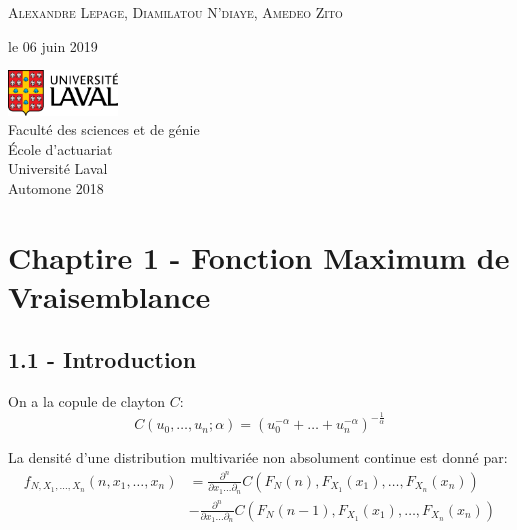 \documentclass{article}
\begin{document}
\begin{titlepage}
		{\scshape\Large Alexandre Lepage, 
			Diamilatou N'diaye, Amedeo Zito \\} %
		
		\vspace*{3\baselineskip}
		
		le 06 juin 2019
		
		\vspace{0.5\baselineskip} %
		
		\vfill %
		
		
		\includegraphics[height=1.2cm]{UL_P.pdf}\\
		
		Faculté des sciences et de génie\\
		École d'actuariat\\
		Université Laval\\
		Automone 2018       
	\end{titlepage}
	
	\newpage
	\pagestyle{empty}
	
	\tableofcontents
	
	\newpage
	\setcounter{page}{1}
	\pagestyle{plain}
	
	\section{Chaptire 1 - Fonction Maximum de Vraisemblance}
	\subsection{1.1 - Introduction}
	
	On a la copule de clayton $C$:
	$$C(u_0,\dots,u_n;\alpha) = (  u_0^{-\alpha} + \dots + u_n^{-\alpha})^{-\frac{1}{\alpha}}$$
	
	La densité d'une distribution multivariée non absolument continue est donné par:
	\begin{align*}
	f_{N,X_1,\dots,X_n}(n,x_1,\dots,x_n) &= \frac{\partial^n}{\partial x_1 \dots \partial_n} C(F_N(n),F_{X_1}(x_1),\dots,F_{X_n}(x_n))\\
	&   - \frac{\partial^n}{\partial x_1 \dots \partial_n} C(F_N(n-1),F_{X_1}(x_1),\dots,F_{X_n}(x_n))
	\end{align*}
	
\end{document}
